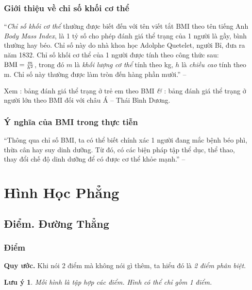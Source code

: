 \documentclass{article}
\numberwithin{equation}{section}
\newtheorem{luuy}{Lưu ý}[section]
\begin{document}
\subsubsection{Giới thiệu về chỉ số khối cơ thể}
``\textit{Chỉ số khối cơ thể} thường được biết đến với tên viết tắt BMI theo tên tiếng Anh \textit{Body Mass Index}, là 1 tỷ số cho phép đánh giá thể trạng của 1 người là gầy, bình thường hay béo. Chỉ số này do nhà khoa học Adolphe Quetelet, người Bỉ, đưa ra năm 1832. Chỉ số khối cơ thể của 1 người được tính theo công thức sau: ${\rm BMI} = \frac{m}{h^2}$, trong đó $m$ là \textit{khối lượng cơ thể} tính theo kg, $h$ là \textit{chiều cao} tính theo m. Chỉ số này thường được làm tròn đến hàng phần mười.'' -- \cite[p. 73]{SGK_Toan_6_Canh_Dieu_tap_2}

Xem \cite[Hình 1, p. 73]{SGK_Toan_6_Canh_Dieu_tap_2}: bảng đánh giá thể trạng ở trẻ em theo BMI \textit{\&} \cite[p. 74]{SGK_Toan_6_Canh_Dieu_tap_2}: bảng đánh giá thể trạng ở người lớn theo BMI đối với châu Á -- Thái Bình Dương.

\subsubsection{Ý nghĩa của BMI trong thực tiễn}
``Thông qua chỉ số BMI, ta có thể biết chính xác 1 người đang mắc bệnh béo phì, thừa cân hay suy dinh dưỡng. Từ đó, có các biện pháp tập thể dục, thể thao, thay đổi chế độ dinh dưỡng để có được cơ thể khỏe mạnh.'' -- \cite[p. 74]{SGK_Toan_6_Canh_Dieu_tap_2}


\section{Hình Học Phẳng}

\subsection{Điểm. Đường Thẳng}

\subsubsection{Điểm}
\textbf{Quy ước.} Khi nói 2 điểm mà không nói gì thêm, ta hiểu đó là \textit{2 điểm phân biệt}.

\begin{luuy}
	Mỗi hình là tập hợp các điểm. Hình có thể chỉ gồm 1 điểm.
\end{luuy}
\end{document}
